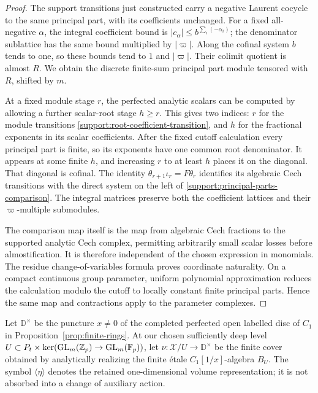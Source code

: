 \begin{proof}
The support transitions just constructed carry a negative Laurent
cocycle to the same principal part, with its coefficients unchanged.
For a fixed all-negative $\alpha$, the integral coefficient bound
is $|c_\alpha|\leq b^{\sum_i(-\alpha_i)}$; the denominator
sublattice has the same bound multiplied by $|\varpi|$.
Along the cofinal system $b$ tends to one, so these bounds tend to
$1$ and $|\varpi|$.  Their colimit quotient is almost $R$.
We obtain the discrete
finite-sum principal part module tensored with $R$, shifted by $m$.

At a fixed module stage $r$, the perfected analytic scalars can
be computed by allowing a further scalar-root stage $h\geq r$.
This gives two indices: $r$ for the module transitions
\eqref{support:root-coefficient-transition}, and $h$ for the
fractional exponents in its scalar coefficients.  After the fixed
cutoff calculation every principal part is finite, so its exponents
have one common root denominator.  It appears at some finite $h$,
and increasing $r$ to at least $h$ places it on the diagonal.
That diagonal is cofinal.  The identity
$\theta_{r+1}\iota_r=F\theta_r$ identifies its algebraic Cech
transitions with the direct system on the left of
\eqref{support:principal-parts-comparison}.  The integral matrices
preserve both the coefficient lattices and their $\varpi$-multiple
submodules.

The comparison map itself is the map from algebraic Cech
fractions to the supported analytic Cech complex, permitting
arbitrarily small scalar losses before almostification.  It is
therefore independent of the chosen expression in monomials.
The residue change-of-variables formula proves coordinate
naturality.  On a compact continuous group parameter, uniform
polynomial approximation reduces the calculation modulo the
cutoff to locally constant finite principal parts.  Hence the
same map and contractions apply to the parameter complexes.
\end{proof}

Let $\mathbb D^\times$ be the puncture $x\ne0$ of the completed perfected
open labelled disc of $C_1$ in Proposition~\ref{prop:finite-rings}. At our
chosen sufficiently deep level
$U\subset P_t\times\ker(\operatorname{GL}_m(\mathbb Z_p)\to\operatorname{GL}_m(\mathbb F_p))$, let
$\nu:\mathcal X/U\to\mathbb D^\times$ be the finite cover obtained by
analytically realizing the finite \'etale $C_1[1/x]$-algebra $B_U$.
The symbol $\langle\eta\rangle$ denotes
the retained one-dimensional volume representation; it is not
absorbed into a change of auxiliary action.

